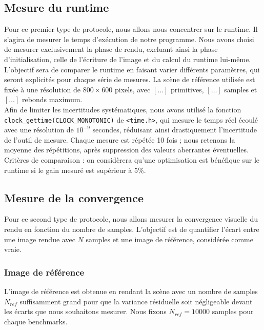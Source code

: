 \subsection{Mesure du runtime}

Pour ce premier type de protocole, nous allons nous concentrer sur le 
runtime. Il s'agira de mesurer le temps d'exécution de notre programme. 
Nous avons choisi de mesurer exclusivement la phase de rendu, excluant 
ainsi la phase d'initialisation, celle de l'écriture de l'image et du 
calcul du runtime lui-même.\\

L'objectif sera de comparer le runtime en faisant varier différents 
paramètres, qui seront explicités pour chaque série de mesures. La scène 
de référence utilisée est fixée à une résolution de $800 \times 600$ 
pixels, avec $[\ldots]$ primitives, $[\ldots]$ samples et $[\ldots]$ 
rebonds maximum.\\

Afin de limiter les incertitudes systématiques, nous avons utilisé la 
fonction \texttt{clock\_gettime(CLOCK\_MONOTONIC)} de \texttt{<time.h>}, 
qui mesure le temps réel écoulé avec une résolution de $10^{-9}$ secondes, 
réduisant ainsi drastiquement l'incertitude de l'outil de mesure. Chaque 
mesure est répétée 10 fois ; nous retenons la moyenne des répétitions, 
après suppression des valeurs aberrantes éventuelles.\\

Critères de comparaison : on considèrera qu'une optimisation est 
bénéfique sur le runtime si le gain mesuré est supérieur à $5\%$.

\subsection{Mesure de la convergence}

Pour ce second type de protocole, nous allons mesurer la convergence 
visuelle du rendu en fonction du nombre de samples. L'objectif est de 
quantifier l'écart entre une image rendue avec $N$ samples et une image 
de référence, considérée comme vraie.\\

\subsubsection{Image de référence}

L'image de référence est obtenue en rendant la scène avec un nombre de 
samples $N_{ref}$ suffisamment grand pour que la variance résiduelle soit négligeable devant les écarts que nous souhaitons mesurer. Nous fixons 
$N_{ref} = 10000$ samples pour chaque benchmarks.\\

